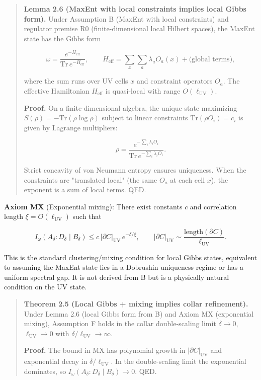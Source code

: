 \begin{quote}
\textbf{Lemma 2.6 (MaxEnt with local constraints implies local Gibbs form).} Under Assumption B (MaxEnt with local constraints) and regulator premise R0 (finite-dimensional local Hilbert spaces), the MaxEnt state has the Gibbs form

\[
\omega = \frac{e^{-H_{\mathrm{eff}}}}{\mathrm{Tr}\,e^{-H_{\mathrm{eff}}}},
\qquad
H_{\mathrm{eff}} = \sum_x \sum_a \lambda_a O_a(x) + \text{(global terms)},
\]

where the sum runs over UV cells \(x\) and constraint operators \(O_a\). The effective Hamiltonian \(H_{\mathrm{eff}}\) is quasi-local with range \(O(\ell_{\mathrm{UV}})\).

\textbf{Proof.} On a finite-dimensional algebra, the unique state maximizing \(S(\rho) = -\mathrm{Tr}(\rho \log \rho)\) subject to linear constraints \(\mathrm{Tr}(\rho O_i) = c_i\) is given by Lagrange multipliers:

\[
\rho = \frac{e^{-\sum_i \lambda_i O_i}}{\mathrm{Tr}\,e^{-\sum_i \lambda_i O_i}}.
\]

Strict concavity of von Neumann entropy ensures uniqueness. When the constraints are "translated local" (the same \(O_a\) at each cell \(x\)), the exponent is a sum of local terms. QED.
\end{quote}

\textbf{Axiom MX} (Exponential mixing): There exist constants \(c\) and correlation length \(\xi = O(\ell_{\mathrm{UV}})\) such that

\[
I_\omega(A_\delta:D_\delta \mid B_\delta) \le
c\,\lvert\partial C\rvert_{\mathrm{UV}}\,e^{-\delta/\xi},
\qquad
\lvert\partial C\rvert_{\mathrm{UV}} \sim \frac{\mathrm{length}(\partial C)}{\ell_{\mathrm{UV}}}.
\]

This is the standard clustering/mixing condition for local Gibbs states, equivalent to assuming the MaxEnt state lies in a Dobrushin uniqueness regime or has a uniform spectral gap. It is not derived from B but is a physically natural condition on the UV state.

\begin{quote}
\textbf{Theorem 2.5 (Local Gibbs + mixing implies collar refinement).} Under Lemma 2.6 (local Gibbs form from B) and Axiom MX (exponential mixing), Assumption F holds in the collar double-scaling limit \(\delta \to 0\), \(\ell_{\mathrm{UV}} \to 0\) with \(\delta/\ell_{\mathrm{UV}} \to \infty\).

\textbf{Proof.} The bound in MX has polynomial growth in \(\lvert\partial C\rvert_{\mathrm{UV}}\) and exponential decay in \(\delta/\ell_{\mathrm{UV}}\). In the double-scaling limit the exponential dominates, so \(I_\omega(A_\delta:D_\delta \mid B_\delta) \to 0\). QED.
\end{quote}

